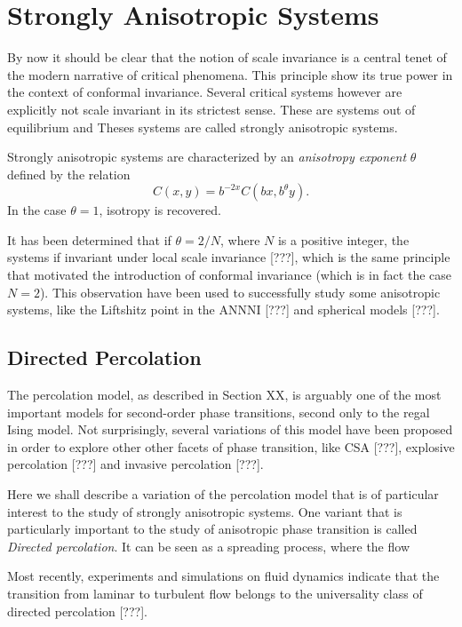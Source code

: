 \chapter{Strongly Anisotropic Systems}
\label{ch5-anis}

By now it should be clear that the notion of scale invariance is a central
tenet of the modern narrative of critical phenomena. This principle show its
true power in the context of conformal invariance. Several critical systems
however are explicitly not scale invariant in its strictest sense. These are
systems out of equilibrium and Theses systems are called strongly anisotropic
systems.

Strongly anisotropic systems are characterized by an \textit{anisotropy
exponent} $\theta$ defined by the relation
\begin{equation}
    C(x, y) = b^{-2x}C(bx, b^\theta y).
\end{equation}
In the case $\theta=1$, isotropy is recovered.

It has been determined that if $\theta = 2/N$, where $N$ is a positive integer,
the systems if invariant under local scale invariance [???], which is the same
principle that motivated the introduction of conformal invariance (which is in
fact the case $N=2$). This observation have been used to successfully study
some anisotropic systems, like the Liftshitz point in the ANNNI [???] and
spherical models [???].


\section{Directed Percolation}
\label{sec:dp}

The percolation model, as described in Section XX, is arguably one of the most
important models for second-order phase transitions, second only to the regal
Ising model. Not surprisingly, several variations of this model have been
proposed in order to explore other other facets of phase transition, like CSA
[???], explosive percolation [???] and invasive percolation [???].

Here we shall describe a variation of the percolation model that is of
particular interest to the study of strongly anisotropic systems. One variant
that is particularly important to the study of anisotropic phase transition is
called \textit{Directed percolation}. It can be seen as a spreading process,
where the flow 

Most recently, experiments and simulations on fluid dynamics indicate
that the transition from laminar to turbulent flow belongs to the
universality class of directed percolation [???].

